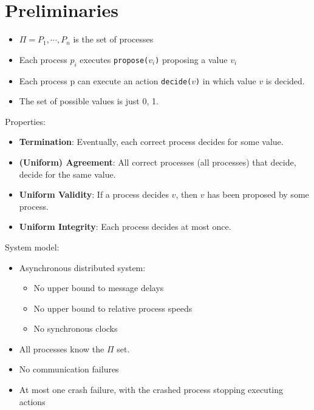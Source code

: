 \documentclass[a4paper,11pt,hidelinks]{article}
\begin{document}
\section{Preliminaries}

\begin{itemize}
    \item $\Pi = {P_1, \cdots, P_n}$ is the set of processes
    \item Each process $p_i$ executes \verb=propose(=$v_i$\verb=)= proposing a value $v_i$
    \item Each process p can execute an action \verb=decide(=$v$\verb=)= in which value $v$ is decided.
    \item The set of possible values is just {0, 1}.
\end{itemize}

\noindent Properties:

\begin{itemize}
    \item \textbf{Termination}: Eventually, each correct process decides for some value.
    \item \textbf{(Uniform) Agreement}: All correct processes (all processes) that decide, decide for the same value.
    \item \textbf{Uniform Validity}: If a process decides $v$, then $v$ has been proposed by some process.
    \item \textbf{Uniform Integrity}: Each process decides at most once.
\end{itemize}

\noindent System model:

\begin{itemize}
    \item Asynchronous distributed system:
          \begin{itemize}
              \item No upper bound to message delays
              \item No upper bound to relative process speeds
              \item No synchronous clocks
          \end{itemize}
    \item All processes know the $\Pi$ set.
    \item No communication failures
    \item At most one crash failure, with the crashed process stopping executing actions
\end{itemize}
\end{document}
